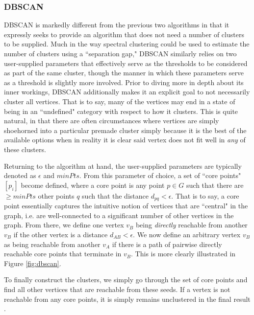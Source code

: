 \documentclass[journal]{IEEEtran}
\begin{document}
\subsubsection{DBSCAN}
DBSCAN is markedly different from the previous two algorithms in that it expressly seeks to provide an algorithm that does not need a number of clusters to be supplied. Much in the way spectral clustering could be used to estimate the number of clusters using a ``separation gap," DBSCAN similarly relies on two user-supplied parameters that effectively serve as the thresholds to be considered as part of the same cluster, though the manner in which these parameters serve as a threshold is slightly more involved. Prior to diving more in depth about its inner workings, DBSCAN additionally makes it an explicit goal to not necessarily cluster all vertices. That is to say, many of the vertices may end in a state of being in an ``undefined" category with respect to how it clusters. This is quite natural, in that there are often circumstances where vertices are simply shoehorned into a particular premade cluster simply because it is the best of the available options when in reality it is clear said vertex does not fit well in \textit{any} of these clusters.

Returning to the algorithm at hand, the user-supplied parameters are typically denoted as $\epsilon$ and $minPts$. From this parameter of choice, a set of ``core points" $[p_i]$ become defined, where a core point is any point $p\in G$ such that there are $\ge minPts$ other points $q$ such that the distance $d_{pq} < \epsilon$. That is to say, a core point essentially captures the intuitive notion of vertices that are ``central" in the graph, i.e. are well-connected to a significant number of other vertices in the graph. From there, we define one vertex $v_B$ being \textit{directly} reachable from another $v_B$ if the other vertex is a distance $d_{AB} < \epsilon$. We now define an arbitrary vertex $v_B$ as being reachable from another $v_A$ if there is a path of pairwise directly reachable core points that terminate in $v_B$. This is more clearly illustrated in Figure \ref{fig:dbscan}.

To finally construct the clusters, we simply go through the set of core points and find all other vertices that are reachable from these seeds. If a vertex is not reachable from any core points, it is simply remains unclustered in the final result \cite{dbscan}.
\end{document}
